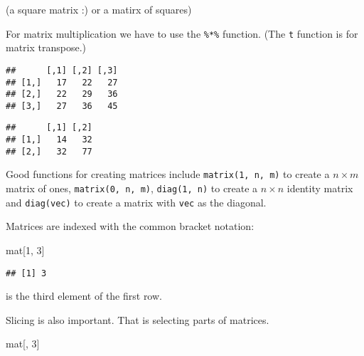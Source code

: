 \documentclass[]{article}
\newenvironment{Shaded}{\begin{snugshade}}{\end{snugshade}}
\newcommand{\KeywordTok}[1]{\textcolor[rgb]{0.13,0.29,0.53}{\textbf{#1}}}
\newcommand{\DecValTok}[1]{\textcolor[rgb]{0.00,0.00,0.81}{#1}}
\newcommand{\StringTok}[1]{\textcolor[rgb]{0.31,0.60,0.02}{#1}}
\newcommand{\OperatorTok}[1]{\textcolor[rgb]{0.81,0.36,0.00}{\textbf{#1}}}
\newcommand{\NormalTok}[1]{#1}
\begin{document}
(a square matrix :) or a matirx of squares)

For matrix multiplication we have to use the \texttt{\%*\%} function.
(The \texttt{t} function is for matrix transpose.)

\begin{Shaded}
\end{Shaded}

\begin{verbatim}
##      [,1] [,2] [,3]
## [1,]   17   22   27
## [2,]   22   29   36
## [3,]   27   36   45
\end{verbatim}

\begin{Shaded}
\end{Shaded}

\begin{verbatim}
##      [,1] [,2]
## [1,]   14   32
## [2,]   32   77
\end{verbatim}

Good functions for creating matrices include \texttt{matrix(1,\ n,\ m)}
to create a \(n\times m\) matrix of ones, \texttt{matrix(0,\ n,\ m)},
\texttt{diag(1,\ n)} to create a \(n\times n\) identity matrix and
\texttt{diag(vec)} to create a matrix with \texttt{vec} as the diagonal.

Matrices are indexed with the common bracket notation:

\begin{Shaded}
\begin{Highlighting}[]
\NormalTok{mat[}\DecValTok{1}\NormalTok{, }\DecValTok{3}\NormalTok{]}
\end{Highlighting}
\end{Shaded}

\begin{verbatim}
## [1] 3
\end{verbatim}

is the third element of the first row.

Slicing is also important. That is selecting parts of matrices.

\begin{Shaded}
\begin{Highlighting}[]
\NormalTok{mat[, }\DecValTok{3}\NormalTok{]}
\end{Highlighting}
\end{Shaded}
\end{document}
